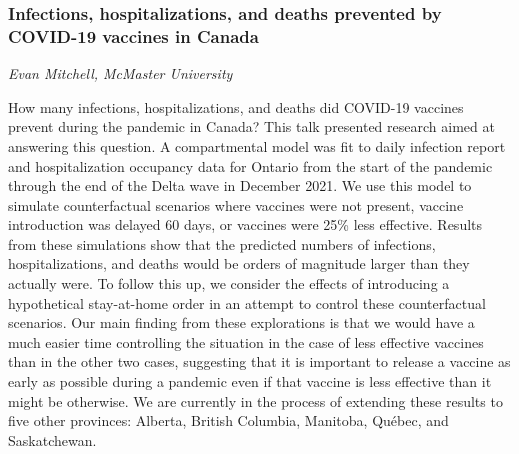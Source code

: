 \subsubsection*{Infections, hospitalizations, and deaths prevented by COVID-19 vaccines in Canada}
\textit{Evan Mitchell, McMaster University}

How many infections, hospitalizations, and deaths did COVID-19 vaccines prevent during the pandemic in Canada? This talk presented research aimed at answering this question. A compartmental model was fit to daily infection report and hospitalization occupancy data for Ontario from the start of the pandemic through the end of the Delta wave in December 2021. We use this model to simulate counterfactual scenarios where vaccines were not present, vaccine introduction was delayed 60 days, or vaccines were 25\% less effective. Results from these simulations show that the predicted numbers of infections, hospitalizations, and deaths would be orders of magnitude larger than they actually were. To follow this up, we consider the effects of introducing a hypothetical stay-at-home order in an attempt to control these counterfactual scenarios. Our main finding from these explorations is that we would have a much easier time controlling the situation in the case of less effective vaccines than in the other two cases, suggesting that it is important to release a vaccine as early as possible during a pandemic even if that vaccine is less effective than it might be otherwise. We are currently in the process of extending these results to five other provinces: Alberta, British Columbia, Manitoba, Qu\'{e}bec, and Saskatchewan.

